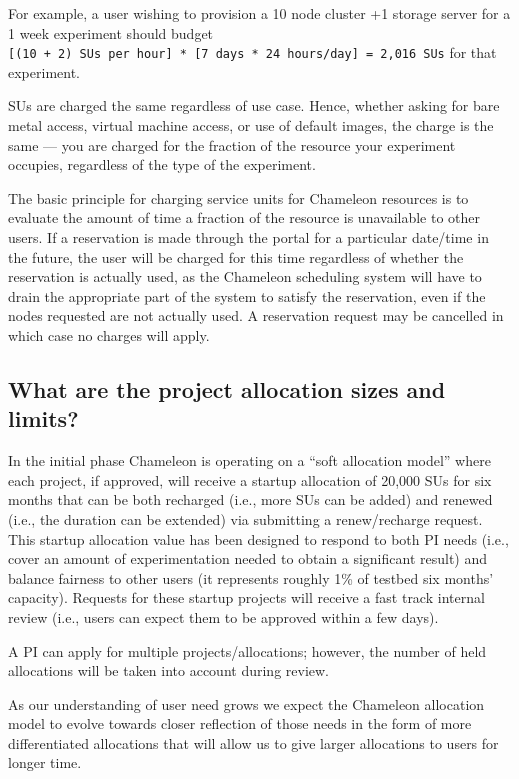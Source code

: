 For example, a user wishing to provision a 10 node cluster +1 storage
server for a 1 week experiment should budget
\texttt{{[}(10\ +\ 2)\ SUs\ per\ hour{]}\ *\ {[}7\ days\ *\ 24\ hours/day{]}\ =\ 2,016\ SUs}
for that experiment.

SUs are charged the same regardless of use case. Hence, whether asking
for bare metal access, virtual machine access, or use of default images,
the charge is the same --- you are charged for the fraction of the
resource your experiment occupies, regardless of the type of the
experiment.

The basic principle for charging service units for Chameleon resources
is to evaluate the amount of time a fraction of the resource is
unavailable to other users. If a reservation is made through the portal
for a particular date/time in the future, the user will be charged for
this time regardless of whether the reservation is actually used, as the
Chameleon scheduling system will have to drain the appropriate part of
the system to satisfy the reservation, even if the nodes requested are
not actually used. A reservation request may be cancelled in which case
no charges will apply.

\subsection{What are the project allocation sizes and
limits?}\label{what-are-the-project-allocation-sizes-and-limits}

In the initial phase Chameleon is operating on a ``soft allocation
model'' where each project, if approved, will receive a startup
allocation of 20,000 SUs for six months that can be both recharged
(i.e., more SUs can be added) and renewed (i.e., the duration can be
extended) via submitting a renew/recharge request. This startup
allocation value has been designed to respond to both PI needs (i.e.,
cover an amount of experimentation needed to obtain a significant
result) and balance fairness to other users (it represents roughly 1\%
of testbed six months' capacity). Requests for these startup projects
will receive a fast track internal review (i.e., users can expect them
to be approved within a few days).

A PI can apply for multiple projects/allocations; however, the number of
held allocations will be taken into account during review.

As our understanding of user need grows we expect the Chameleon
allocation model to evolve towards closer reflection of those needs in
the form of more differentiated allocations that will allow us to give
larger allocations to users for longer time.

